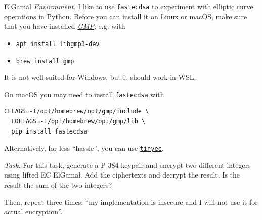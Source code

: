 \documentclass{practice}
\begin{document}
\begin{task}{ElGamal}
  \textit{Environment.}
  I like to use \href{https://pypi.org/project/fastecdsa/#arbitrary-elliptic-curve-arithmetic}{\texttt{fastecdsa}} to experiment with elliptic curve operations in Python.
  Before you can install it on Linux or macOS, make sure that you have installed \href{https://gmplib.org}{\textit{GMP}}, e.g. with
  \begin{itemize}
    \item \texttt{apt install libgmp3-dev}
    \item \texttt{brew install gmp}
  \end{itemize}
  It is not well suited for Windows, but it should work in WSL.
  
  On macOS you may need to install \href{https://github.com/AntonKueltz/fastecdsa/issues/74#issuecomment-932757298}{\texttt{fastecdsa}} with
  \begin{Verbatim}
CFLAGS=-I/opt/homebrew/opt/gmp/include \
  LDFLAGS=-L/opt/homebrew/opt/gmp/lib \
  pip install fastecdsa
  \end{Verbatim}

  Alternatively, for less \enquote{hassle}, you can use \href{https://pypi.org/project/tinyec/}{\texttt{tinyec}}.

  \textit{Task.}
  For this task, generate a P-384 keypair and encrypt two different integers using lifted EC ElGamal.
  Add the ciphertexts and decrypt the result.
  Is the result the sum of the two integers?

  Then, repeat three times: \enquote{my implementation is insecure and I will not use it for actual encryption}.
\end{task}
\end{document}
